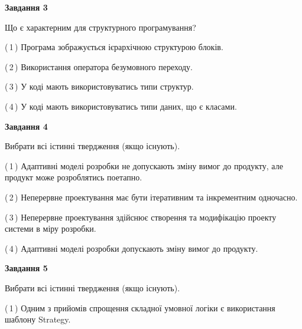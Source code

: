 \documentclass[10pt, ukrainian]{article}
\begin{document}
{\begin {large}
{\begin {center}\textbf{Завдання 3}\end {center}}\par
Що є характерним для структурного програмування?\par
\vspace{2mm}



(\,1\,) Програма зображується ієрархічною структурою блоків.%



(\,2\,) Використання оператора безумовного переходу. %



(\,3\,) У коді мають використовуватись типи структур. %



(\,4\,) У коді мають використовуватись типи даних, що є класами. %


{\begin {center}\textbf{Завдання 4}\end {center}}\par
Вибрати всі істинні твердження (якщо існують).\par
\vspace{2mm}



(\,1\,) Адаптивні моделі розробки не допускають зміну вимог до продукту, але продукт може розроблятись поетапно. %



(\,2\,) Неперервне проектування має бути ітеративним та інкрементним одночасно. %



(\,3\,) Неперервне проектування здійснює створення та модифікацію проекту системи в міру розробки. %



(\,4\,) Адаптивні моделі розробки допускають зміну вимог до продукту. %


{\begin {center}\textbf{Завдання 5}\end {center}}\par
Вибрати всі істинні твердження (якщо існують).\par
\vspace{2mm}



(\,1\,) Одним з прийомів спрощення складної умовної логіки є використання шаблону Strategy. %




\end{large}}
\end{document}

